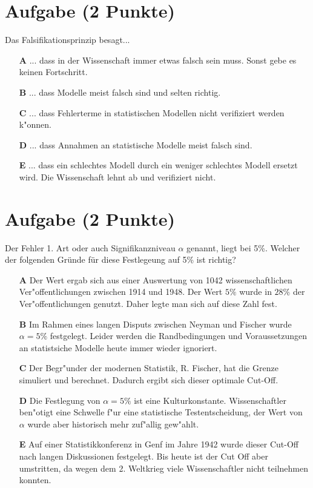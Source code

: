 \documentclass[a4paper, 10pt]{scrartcl}\usepackage[]{graphicx}\usepackage[]{color}
\begin{document}
\section{Aufgabe \hfill (2 Punkte)}

Das Falsifikationsprinzip besagt... 



\begin{enumerate}
\item [\textbf{A} \msquare] ... dass in der Wissenschaft immer etwas falsch sein muss. Sonst gebe es keinen Fortschritt.
\item [\textbf{B} \msquare] ... dass Modelle meist falsch sind und selten richtig.
\item [\textbf{C} \msquare] ... dass Fehlerterme in statistischen Modellen nicht verifiziert werden k{"o}nnen.
\item [\textbf{D} \msquare] ... dass Annahmen an statistische Modelle meist falsch sind.
\item [\textbf{E} \msquare] ... dass ein schlechtes Modell durch ein weniger schlechtes Modell ersetzt wird. Die Wissenschaft lehnt ab und verifiziert nicht.
\end{enumerate}

\section{Aufgabe \hfill (2 Punkte)}

Der Fehler 1. Art oder auch Signifikanzniveau $\alpha$ genannt, liegt bei
5\%. Welcher der folgenden Gr{\"u}nde f{\"u}r diese Festlegeung auf 5\% ist richtig?



\begin{enumerate}
\item [\textbf{A} \msquare] Der Wert ergab sich aus einer Auswertung von 1042 wissenschaftlichen Ver{"o}ffentlichungen zwischen 1914 und 1948. Der Wert $5\%$ wurde in $28\%$ der Ver{"o}ffentlichungen genutzt. Daher legte man sich auf diese Zahl fest.
\item [\textbf{B} \msquare] Im Rahmen eines langen Disputs zwischen Neyman und Fischer wurde $\alpha = 5\%$ festgelegt. Leider werden die Randbedingungen und Voraussetzungen an statistsiche Modelle heute immer wieder ignoriert.
\item [\textbf{C} \msquare] Der Begr{"u}nder der modernen Statistik, R. Fischer, hat die Grenze simuliert und berechnet. Dadurch ergibt sich dieser optimale Cut-Off.
\item [\textbf{D} \msquare] Die Festlegung von $\alpha = 5\%$ ist eine Kulturkonstante. Wissenschaftler ben{"o}tigt eine Schwelle f{"u}r eine statistische Testentscheidung, der Wert von $\alpha$ wurde aber historisch mehr zuf{"a}llig gew{"a}hlt.
\item [\textbf{E} \msquare] Auf einer Statistikkonferenz in Genf im Jahre 1942 wurde dieser Cut-Off nach langen Diskussionen festgelegt. Bis heute ist der Cut Off aber umstritten, da wegen dem 2. Weltkrieg viele Wissenschaftler nicht teilnehmen konnten.
\end{enumerate}
\end{document}
